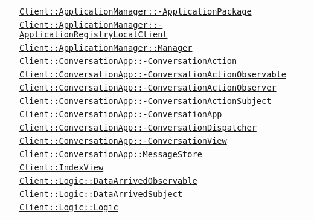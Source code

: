 \begin{longtable}{|>{\centering}m{3cm}|m{10cm}<{\centering}|}
& \hyperref[Client::ApplicationManager::ApplicationPackage]{\texttt{Client::ApplicationManager::-\linebreak ApplicationPackage}}\\
& \hyperref[Client::ApplicationManager::ApplicationRegistryLocalClient]{\texttt{Client::ApplicationManager::-\linebreak ApplicationRegistryLocalClient}}\\
& \hyperref[Client::ApplicationManager::Manager]{\texttt{Client::ApplicationManager::Manager}}\\
& \hyperref[Client::ConversationApp::ConversationAction]{\texttt{Client::ConversationApp::-\linebreak ConversationAction}}\\
& \hyperref[Client::ConversationApp::ConversationActionObservable]{\texttt{Client::ConversationApp::-\linebreak ConversationActionObservable}}\\
& \hyperref[Client::ConversationApp::ConversationActionObserver]{\texttt{Client::ConversationApp::-\linebreak ConversationActionObserver}}\\
& \hyperref[Client::ConversationApp::ConversationActionSubject]{\texttt{Client::ConversationApp::-\linebreak ConversationActionSubject}}\\
& \hyperref[Client::ConversationApp::ConversationApp]{\texttt{Client::ConversationApp::-\linebreak ConversationApp}}\\
& \hyperref[Client::ConversationApp::ConversationDispatcher]{\texttt{Client::ConversationApp::-\linebreak ConversationDispatcher}}\\
& \hyperref[Client::ConversationApp::ConversationView]{\texttt{Client::ConversationApp::-\linebreak ConversationView}}\\
& \hyperref[Client::ConversationApp::MessageStore]{\texttt{Client::ConversationApp::MessageStore}}\\
& \hyperref[Client::IndexView]{\texttt{Client::IndexView}}\\
& \hyperref[Client::Logic::DataArrivedObservable]{\texttt{Client::Logic::DataArrivedObservable}}\\
& \hyperref[Client::Logic::DataArrivedSubject]{\texttt{Client::Logic::DataArrivedSubject}}\\
& \hyperref[Client::Logic::Logic]{\texttt{Client::Logic::Logic}}\\

\end{longtable}

